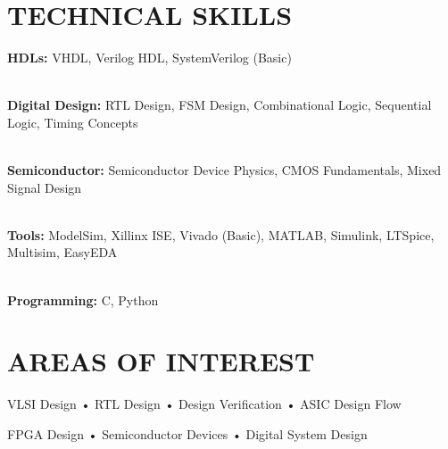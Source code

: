 \documentclass[letterpaper,11pt]{article}
\begin{document}
\section{TECHNICAL SKILLS}

\begin{itemize}[leftmargin=0.15in,label={}]
\small{\item{

\textbf{HDLs:}
VHDL, Verilog HDL, SystemVerilog (Basic)

\\

\textbf{Digital Design:}
RTL Design, FSM Design, Combinational Logic, Sequential Logic, Timing Concepts

\\

\textbf{Semiconductor:}
Semiconductor Device Physics, CMOS Fundamentals, Mixed Signal Design

\\

\textbf{Tools:}
ModelSim, Xillinx ISE, Vivado (Basic), MATLAB, Simulink, LTSpice, Multisim, EasyEDA

\\

\textbf{Programming:}
C, Python

}}
\end{itemize}

\vspace{-10pt}


\section{AREAS OF INTEREST}

VLSI Design \quad • \quad RTL Design \quad • \quad Design Verification \quad • \quad ASIC Design Flow

FPGA Design \quad • \quad Semiconductor Devices \quad • \quad Digital System Design
\end{document}
